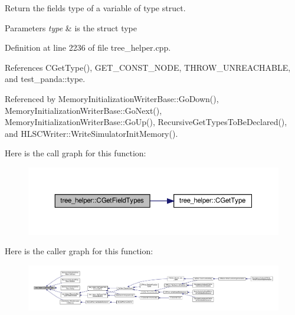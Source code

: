 Return the fields type of a variable of type struct. 


\begin{DoxyParams}{Parameters}
{\em type} & is the struct type \\
\hline
\end{DoxyParams}


Definition at line 2236 of file tree\+\_\+helper.\+cpp.



References C\+Get\+Type(), G\+E\+T\+\_\+\+C\+O\+N\+S\+T\+\_\+\+N\+O\+DE, T\+H\+R\+O\+W\+\_\+\+U\+N\+R\+E\+A\+C\+H\+A\+B\+LE, and test\+\_\+panda\+::type.



Referenced by Memory\+Initialization\+Writer\+Base\+::\+Go\+Down(), Memory\+Initialization\+Writer\+Base\+::\+Go\+Next(), Memory\+Initialization\+Writer\+Base\+::\+Go\+Up(), Recursive\+Get\+Types\+To\+Be\+Declared(), and H\+L\+S\+C\+Writer\+::\+Write\+Simulator\+Init\+Memory().

Here is the call graph for this function\+:
\nopagebreak
\begin{figure}[H]
\begin{center}
\leavevmode
\includegraphics[width=350pt]{d7/d99/classtree__helper_a0609784685642ee8a73ecbb32d5c3562_cgraph}
\end{center}
\end{figure}
Here is the caller graph for this function\+:
\nopagebreak
\begin{figure}[H]
\begin{center}
\leavevmode
\includegraphics[width=350pt]{d7/d99/classtree__helper_a0609784685642ee8a73ecbb32d5c3562_icgraph}
\end{center}
\end{figure}
\mbox{\label{classtree__helper_aa65ede36196d49543afb324151f71ed3}} 
